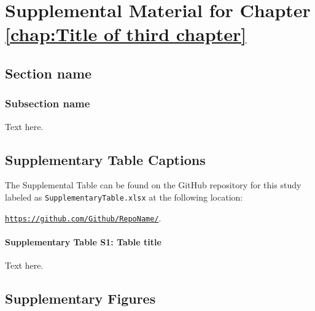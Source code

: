 \appendix{}

\chapter{Supplemental Material for Chapter \ref{chap:Title of third chapter}}

\section{Section name}

\subsection{Subsection name}
Text here.

\section{Supplementary Table Captions}

The Supplemental Table can be found on the GitHub repository for this study labeled as \verb|SupplementaryTable.xlsx| at the following location: 

\noindent \href{https://github.com/Github/RepoName/}{\texttt{https://github.com/Github/RepoName/}}.

\par\noindent\dotfill

\subsubsection{Supplementary Table S1: Table title}
Text here.

\section{Supplementary Figures}

